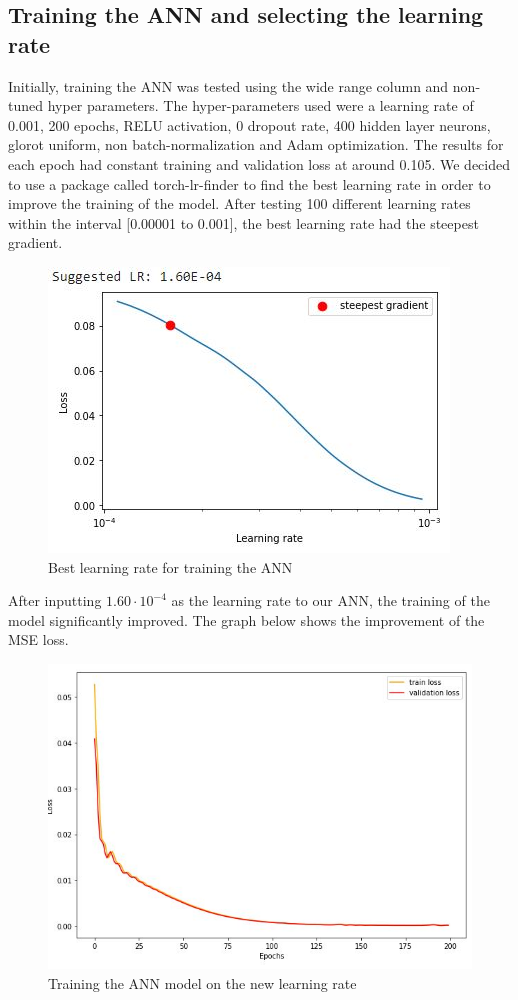 \documentclass[12pt,a4paper]{article}
\begin{document}
\subsection{Training the ANN and selecting the learning rate}
Initially, training the ANN was tested using the wide range column and non-tuned hyper parameters. The hyper-parameters used were a learning rate of 0.001, 200 epochs, RELU activation, 0 dropout rate, 400 hidden layer neurons, glorot uniform, non batch-normalization and Adam optimization. The results for each epoch had constant training and validation loss at around 0.105.
We decided to use a package called torch-lr-finder to find the best learning rate in order to improve the training of the model. After testing 100 different learning rates within the interval [0.00001 to 0.001], the best learning rate had the steepest gradient.
\begin{figure}[H]
    \centering
    \includegraphics[scale=1]{Best learning rate for ANN for wide range.JPG}
    \caption{Best learning rate for training the ANN}
\end{figure}
After inputting $1.60 \cdot 10^{-4}$ as the learning rate to our ANN, the training of the model significantly improved. The graph below shows the improvement of the MSE loss.
\begin{figure}[H]
    \centering
    \includegraphics[scale=0.8]{ANN Option Pricing MSE loss.JPG}
    \caption{Training the ANN model on the new learning rate}
\end{figure}
\end{document}
